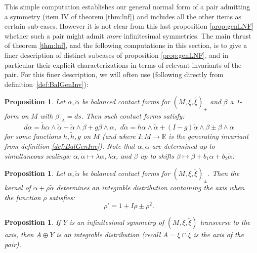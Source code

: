 \documentclass[10pt]{amsart}
\newcommand{\R}{\mathbb{R}}
\newtheorem{prop}[thm]{Proposition}
\theoremstyle{definition}
\begin{document}
This simple computation establishes our general normal form of a pair admitting a symmetry (item IV of theorem \ref{thm:lnf}) and includes all the other items as certain sub-cases. However it is not clear from this last proposition \ref{prop:genLNF} whether such a pair might admit {\em more} infinitesimal symmetries. The main thrust of theorem \ref{thm:lnf}, and the following computations in this section, is to give a finer description of distinct subcases of proposition \ref{prop:genLNF}, and in particular their explicit characterizations in terms of relevant invariants of the pair. For this finer description, we will often use (following directly from definition~\ref{def:BalGenInv}):

\begin{prop}
    Let $\alpha, \tilde\alpha$ be balanced contact forms for $(M, \xi, \tilde \xi)_\pm$ and $\beta$ a 1-form on $M$ with $\beta|_A = ds$. Then such contact forms satisfy:
    \begin{equation}\label{eq:GenBalStrEq}
        d\alpha = \tilde h \alpha\wedge\tilde\alpha + \tilde\alpha\wedge \beta + g \beta\wedge\alpha , ~~d\tilde\alpha = h \alpha\wedge\tilde\alpha + (I - g )\tilde\alpha\wedge \beta \pm  \beta\wedge\alpha
    \end{equation}
    for some functions $h, \tilde h,  g$ on $M$ (and where $I:M\to\R$ is the generating invariant from definition \ref{def:BalGenInv}). Note that $\alpha, \tilde\alpha$ are determined up to simultaneous scalings: $\alpha, \tilde\alpha\mapsto \lambda\alpha, \lambda\tilde\alpha$, and $\beta$ up to shifts $\beta\mapsto \beta + b_1\alpha + b_2\tilde\alpha$.
\end{prop}

\begin{prop}\label{prop:IntDist}
    Let $\alpha, \tilde\alpha$ be balanced contact forms for $(M, \xi, \tilde \xi)_\pm$. Then the kernel of $\alpha + \rho \tilde\alpha$ determines an integrable distribution containing the axis when the function $\rho$ satisfies:
    \begin{equation}\label{eq:Ric}
        \rho' = 1 + I\rho \pm \rho^2.
    \end{equation}
\end{prop}

\begin{prop}
    If $Y$ is an infinitesimal symmetry of $(M, \xi, \tilde\xi)$ transverse to the axis, then $A\oplus Y$ is an integrable distribution (recall $A = \xi \cap \tilde\xi$ is the axis of the pair).
\end{prop}
\end{document}
